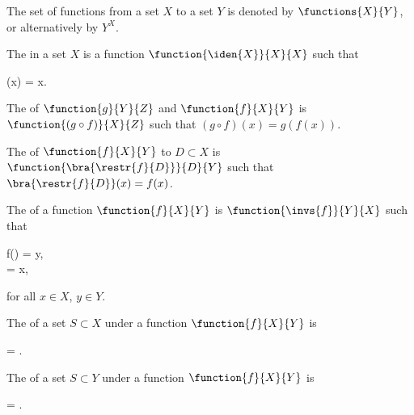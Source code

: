 \documentclass[b5paper, english, oneside]{memoir}
\begin{document}
\begin{definition}
The set of functions from a set $X$ to a set $Y$ is denoted by $\functions{X}{Y}$, or alternatively by $Y^X$. 
\end{definition}

\begin{definition}
The  in a set $X$ is a function $\function{\iden{X}}{X}{X}$ such that
\begin{eqs}
(x) = x. 
\end{eqs}
\end{definition}

\begin{definition}[Composition]
The  of $\function{g}{Y}{Z}$ and $\function{f}{X}{Y}$ is $\function{(g \circ f)}{X}{Z}$ such that $(g \circ f)(x) = g(f(x))$. 
\end{definition}

\begin{definition}[Restriction]
The  of $\function{f}{X}{Y}$ to $D \subset X$ is $\function{\bra{\restr{f}{D}}}{D}{Y}$ such that $\bra{\restr{f}{D}}(x) = f(x)$. 
\end{definition}

\begin{definition}
The  of a function $\function{f}{X}{Y}$ is $\function{\invs{f}}{Y}{X}$ such that
\begin{eqs}
f() = y, \\
 = x,
\end{eqs}
for all $x \in X$, $y \in Y$.
\end{definition}

\begin{definition}
The  of a set $S \subset X$ under a function $\function{f}{X}{Y}$ is
\begin{eqs}
 = .
\end{eqs}
\end{definition}

\begin{definition}
The  of a set $S \subset Y$ under a function $\function{f}{X}{Y}$ is
\begin{eqs}
 = .
\end{eqs}
\end{definition}
\end{document}
